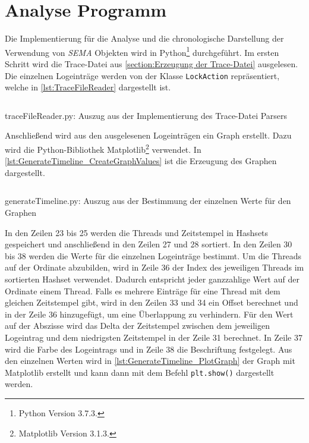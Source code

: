 \section{Analyse Programm}
\label{section:Implementierung:Analyse Programm}
Die Implementierung für die Analyse und die chronologische Darstellung der
Verwendung von \textit{SEMA} Objekten wird in Python\footnote{Python Version
3.7.3.} durchgeführt. Im ersten Schritt wird die Trace-Datei aus
\cref{section:Erzeugung der Trace-Datei} ausgelesen. Die einzelnen Logeinträge
werden von der Klasse
\texttt{Lock\-Action} repräsentiert, welche in \cref{lst:TraceFileReader}
dargestellt ist.

\begin{listing}[ht]
  \inputminted[frame=lines,linenos,firstline=1,lastline=10]{python}{./Python/traceFileReader.py}
  \caption{traceFileReader.py: Auszug aus der Implementierung des Trace-Datei Parsers}
  \label{lst:TraceFileReader}
\end{listing}

Anschließend wird aus den ausgelesenen Logeinträgen ein Graph erstellt. Dazu
wird die Python-Bibliothek Matplotlib\footnote{Matplotlib Version 3.1.3.}
verwendet. In \cref{lst:GenerateTimeline_CreateGraphValues} ist die Erzeugung
des Graphen dargestellt.

\begin{listing}[ht]
  \inputminted[frame=lines,linenos,firstline=16,lastline=38]{python}{./Python/generateTimeline.py}
  \caption{generateTimeline.py: Auszug aus der Bestimmung der einzelnen Werte für den Graphen}
  \label{lst:GenerateTimeline_CreateGraphValues}
\end{listing}

In den Zeilen 23 bis 25 werden die Threads und Zeitstempel in Hashsets
gespeichert und anschließend in den Zeilen 27 und 28 sortiert. In den Zeilen 30
bis 38 werden die Werte für die einzelnen Logeinträge bestimmt. Um die Threads
auf der Ordinate abzubilden, wird in Zeile 36 der Index des jeweiligen Threads
im sortierten Hashset verwendet. Dadurch entspricht jeder ganzzahlige Wert auf
der Ordinate einem Thread. Falls es mehrere Einträge für eine Thread mit dem
gleichen Zeitstempel gibt, wird in den Zeilen 33 und 34 ein Offset berechnet und
in der Zeile 36 hinzugefügt, um eine Überlappung zu verhindern. Für den Wert auf
der Abszisse wird das Delta der Zeitstempel zwischen dem jeweiligen Logeintrag
und dem niedrigsten Zeitstempel in der Zeile 31 berechnet. In Zeile 37 wird die
Farbe des Logeintrags und in Zeile 38 die Beschriftung festgelegt. Aus den
einzelnen Werten wird in \cref{lst:GenerateTimeline_PlotGraph} der Graph mit
Matplotlib erstellt und kann dann mit dem Befehl \texttt{plt.show()} dargestellt
werden.

